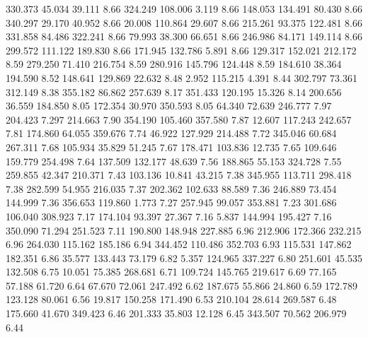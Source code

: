  330.373   45.034   39.111         8.66
 324.249  108.006    3.119         8.66
 148.053  134.491   80.430         8.66
 340.297   29.170   40.952         8.66
  20.008  110.864   29.607         8.66
 215.261   93.375  122.481         8.66
 331.858   84.486  322.241         8.66
  79.993   38.300   66.651         8.66
 246.986   84.171  149.114         8.66
 299.572  111.122  189.830         8.66
 171.945  132.786    5.891         8.66
 129.317  152.021  212.172         8.59
 279.250   71.410  216.754         8.59
 280.916  145.796  124.448         8.59
 184.610   38.364  194.590         8.52
 148.641  129.869   22.632         8.48
   2.952  115.215    4.391         8.44
 302.797   73.361  312.149         8.38
 355.182   86.862  257.639         8.17
 351.433  120.195   15.326         8.14
 200.656   36.559  184.850         8.05
 172.354   30.970  350.593         8.05
  64.340   72.639  246.777         7.97
 204.423    7.297  214.663         7.90
 354.190  105.460  357.580         7.87
  12.607  117.243  242.657         7.81
 174.860   64.055  359.676         7.74
  46.922  127.929  214.488         7.72
 345.046   60.684  267.311         7.68
 105.934   35.829   51.245         7.67
 178.471  103.836   12.735         7.65
 109.646  159.779  254.498         7.64
 137.509  132.177   48.639         7.56
 188.865   55.153  324.728         7.55
 259.855   42.347  210.371         7.43
 103.136   10.841   43.215         7.38
 345.955  113.711  298.418         7.38
 282.599   54.955  216.035         7.37
 202.362  102.633   88.589         7.36
 246.889   73.454  144.999         7.36
 356.653  119.860    1.773         7.27
 257.945   99.057  353.881         7.23
 301.686  106.040  308.923         7.17
 174.104   93.397   27.367         7.16
   5.837  144.994  195.427         7.16
 350.090   71.294  251.523         7.11
 190.800  148.948  227.885         6.96
 212.906  172.366  232.215         6.96
 264.030  115.162  185.186         6.94
 344.452  110.486  352.703         6.93
 115.531  147.862  182.351         6.86
  35.577  133.443   73.179         6.82
   5.357  124.965  337.227         6.80
 251.601   45.535  132.508         6.75
  10.051   75.385  268.681         6.71
 109.724  145.765  219.617         6.69
  77.165   57.188   61.720         6.64
  67.670   72.061  247.492         6.62
 187.675   55.866   24.860         6.59
 172.789  123.128   80.061         6.56
  19.817  150.258  171.490         6.53
 210.104   28.614  269.587         6.48
 175.660   41.670  349.423         6.46
 201.333   35.803   12.128         6.45
 343.507   70.562  206.979         6.44
